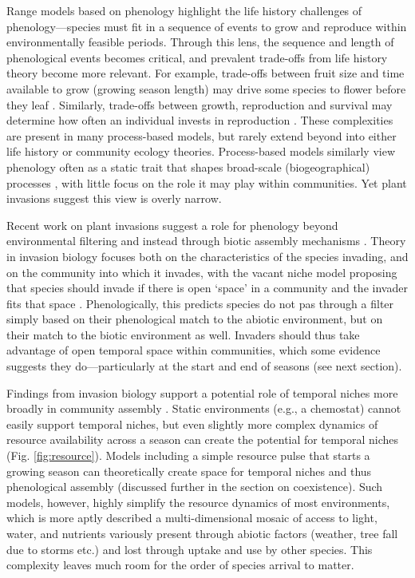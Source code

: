 \documentclass[11pt]{article}
\begin{document}
Range models based on phenology highlight the life history challenges of phenology---species must fit in a sequence of events to grow and reproduce within environmentally feasible periods. Through this lens, the sequence and length of phenological events becomes critical, and prevalent trade-offs from life history theory become more relevant. For example, trade-offs between fruit size and time available to grow (growing season length) may drive some species to flower before they leaf \citep{dan2021nph}. Similarly, trade-offs between growth, reproduction and survival may determine how often an individual invests in reproduction \citep{schaffer1974optimal,law1979cost,stearns1998evolution}. These complexities are present in many process-based models, but rarely extend beyond into either life history or community ecology theories. Process-based models similarly view phenology often as a static trait that shapes broad-scale (biogeographical) processes \citep{Chuine:2010gm}, with little focus on the role it may play within communities. Yet plant invasions suggest this view is overly narrow.

Recent work on plant invasions suggest a role for phenology beyond environmental filtering and instead through biotic assembly mechanisms \citep{wolkovich2011phenology,Fridley:2012fj}. Theory in invasion biology focuses both on the characteristics of the species invading, and on the community into which it invades, with the vacant niche model proposing that species should invade if there is open `space' in a community and the invader fits that space \citep{Elton:1958bk}. Phenologically, this predicts species do not pas through a filter simply based on their phenological match to the abiotic environment, but on their match to the biotic environment as well. Invaders should thus take advantage of open temporal space within communities, which some evidence suggests they do---particularly at the start and end of seasons (see next section). 

Findings from invasion biology support a potential role of temporal niches more broadly in community assembly \citep{gotelli1996}. Static environments (e.g., a chemostat) cannot easily support temporal niches, but even slightly more complex dynamics of resource availability across a season can create the potential for temporal niches (Fig. \ref{fig:resource}). Models including a simple resource pulse that starts a growing season can theoretically create space for temporal niches and thus phenological assembly (discussed further in the section on coexistence). Such models, however, highly simplify the resource dynamics of most environments, which is more aptly described a multi-dimensional mosaic of access to light, water, and nutrients variously present through abiotic factors (weather, tree fall due to storms etc.) and lost through uptake and use by other species. This complexity leaves much room for the order of species arrival to matter.
\end{document}
